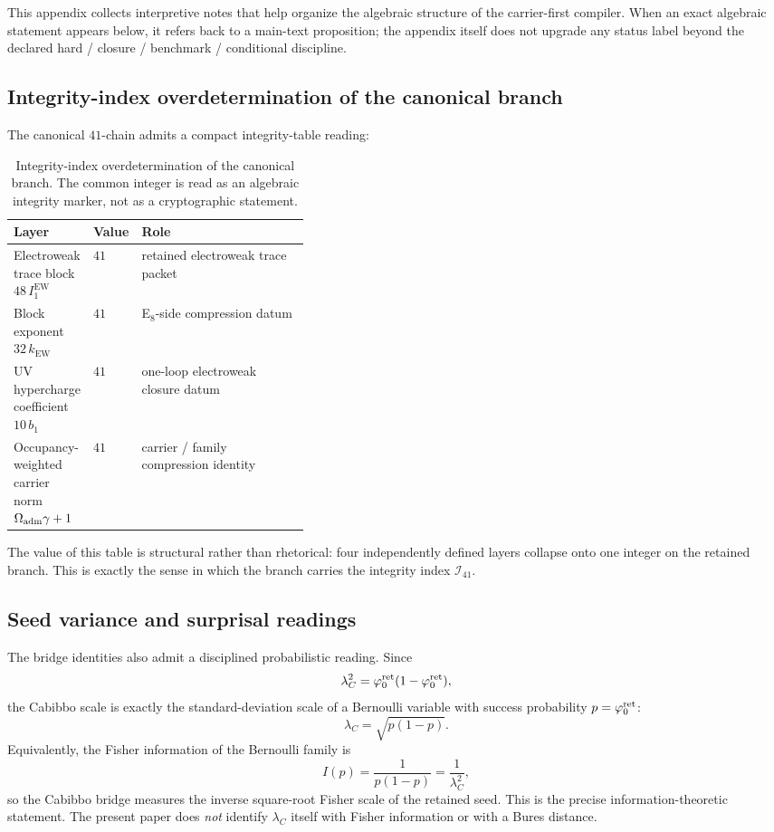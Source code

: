 This appendix collects interpretive notes that help organize the algebraic structure of the carrier-first compiler. When an exact algebraic statement appears below, it refers back to a main-text proposition; the appendix itself does not upgrade any status label beyond the declared hard / closure / benchmark / conditional discipline.

\subsection{Integrity-index overdetermination of the canonical branch}

The canonical $41$-chain admits a compact integrity-table reading:

\begin{table}[H]
\centering
\small
\begin{tabularx}{\linewidth}{@{}>{\raggedright\arraybackslash}p{0.26\linewidth}>{\raggedleft\arraybackslash}p{0.12\linewidth}Y@{}}
\toprule
Layer & Value & Role \\
\midrule
Electroweak trace block $48\,I_1^{\mathrm{EW}}$ & $41$ & retained electroweak trace packet \\
Block exponent $32\,k_{\mathrm{EW}}$ & $41$ & E$_8$-side compression datum \\
UV hypercharge coefficient $10\,b_1$ & $41$ & one-loop electroweak closure datum \\
Occupancy-weighted carrier norm $\Omega_{\mathrm{adm}}\gamma+1$ & $41$ & carrier / family compression identity \\
\bottomrule
\end{tabularx}
\caption{Integrity-index overdetermination of the canonical branch. The common integer is read as an algebraic integrity marker, not as a cryptographic statement.}
\label{tab:checksum-41}
\end{table}

The value of this table is structural rather than rhetorical: four independently defined layers collapse onto one integer on the retained branch. This is exactly the sense in which the branch carries the integrity index $\mathcal I_{41}$.

\subsection{Seed variance and surprisal readings}

The bridge identities also admit a disciplined probabilistic reading. Since
\[
\lambda_C^2=\varphi_0^{\mathrm{ret}}(1-\varphi_0^{\mathrm{ret}}),
\]
the Cabibbo scale is exactly the standard-deviation scale of a Bernoulli variable with success probability $p=\varphi_0^{\mathrm{ret}}$:
\[
\lambda_C=\sqrt{p(1-p)}.
\]
Equivalently, the Fisher information of the Bernoulli family is
\[
I(p)=\frac{1}{p(1-p)}=\frac{1}{\lambda_C^2},
\]
so the Cabibbo bridge measures the inverse square-root Fisher scale of the retained seed. This is the precise information-theoretic statement. The present paper does \emph{not} identify $\lambda_C$ itself with Fisher information or with a Bures distance.

